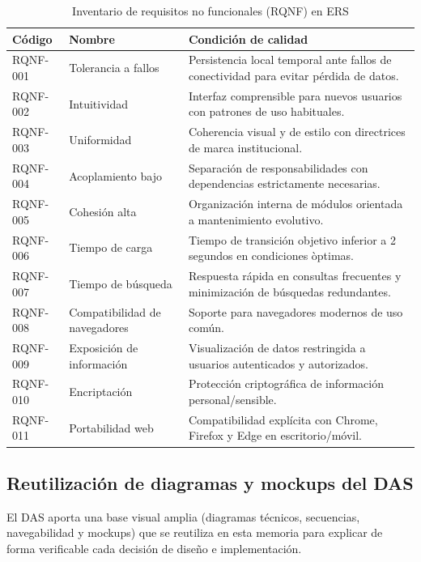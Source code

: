 \begin{table}[!htbp]
\centering
\small
\begin{tabular}{|P{1.6cm}|P{3.2cm}|P{6.9cm}|}
\hline
\textbf{C\'odigo} & \textbf{Nombre} & \textbf{Condici\'on de calidad} \\
\hline
RQNF-001 & Tolerancia a fallos & Persistencia local temporal ante fallos de conectividad para evitar p\'erdida de datos. \\
\hline
RQNF-002 & Intuitividad & Interfaz comprensible para nuevos usuarios con patrones de uso habituales. \\
\hline
RQNF-003 & Uniformidad & Coherencia visual y de estilo con directrices de marca institucional. \\
\hline
RQNF-004 & Acoplamiento bajo & Separaci\'on de responsabilidades con dependencias estrictamente necesarias. \\
\hline
RQNF-005 & Cohesi\'on alta & Organizaci\'on interna de m\'odulos orientada a mantenimiento evolutivo. \\
\hline
RQNF-006 & Tiempo de carga & Tiempo de transici\'on objetivo inferior a 2 segundos en condiciones \`optimas. \\
\hline
RQNF-007 & Tiempo de b\'usqueda & Respuesta r\'apida en consultas frecuentes y minimizaci\'on de b\'usquedas redundantes. \\
\hline
RQNF-008 & Compatibilidad de navegadores & Soporte para navegadores modernos de uso com\'un. \\
\hline
RQNF-009 & Exposici\'on de informaci\'on & Visualizaci\'on de datos restringida a usuarios autenticados y autorizados. \\
\hline
RQNF-010 & Encriptaci\'on & Protecci\'on criptogr\'afica de informaci\'on personal/sensible. \\
\hline
RQNF-011 & Portabilidad web & Compatibilidad expl\'icita con Chrome, Firefox y Edge en escritorio/m\'ovil. \\
\hline
\end{tabular}
\normalsize
\caption{Inventario de requisitos no funcionales (RQNF) en ERS}
\label{tab:rqnf-inventario-completo}
\end{table}

\subsection{Reutilizaci\'on de diagramas y mockups del DAS}

El DAS aporta una base visual amplia (diagramas t\'ecnicos, secuencias,
navegabilidad y mockups) que se reutiliza en esta memoria para explicar
de forma verificable cada decisi\'on de dise\~no e implementaci\'on.

